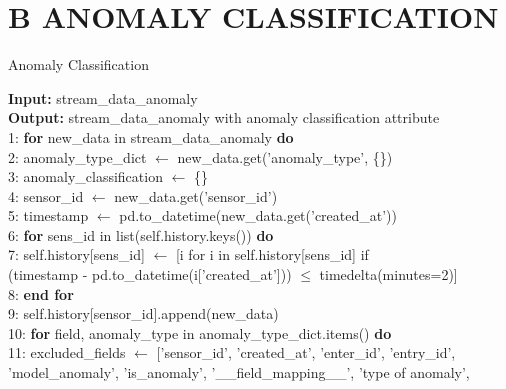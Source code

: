 \section*{B \quad ANOMALY CLASSIFICATION}
\begin{breakablealgorithm}
\footnotesize
\caption{Anomaly Classification}
\begin{flushleft}
\textbf{Input:} stream\_data\_anomaly \\
\textbf{Output:} stream\_data\_anomaly with anomaly classification attribute \\
1: \textbf{for} new\_data in stream\_data\_anomaly \textbf{do} \\
2: \hspace{0.5em} anomaly\_type\_dict $\gets$ new\_data.get('anomaly\_type', \{\}) \\
3: \hspace{0.5em} anomaly\_classification $\gets$ \{\} \\
4: \hspace{0.5em} sensor\_id $\gets$ new\_data.get('sensor\_id') \\
5: \hspace{0.5em} timestamp $\gets$ pd.to\_datetime(new\_data.get('created\_at')) \\
6: \hspace{0.5em} \textbf{for} sens\_id in list(self.history.keys()) \textbf{do} \\
7: \hspace{1em} self.history[sens\_id] $\gets$ [i for i in self.history[sens\_id] if \\
\hspace{1.5em} (timestamp - pd.to\_datetime(i['created\_at'])) $\leq$ timedelta(minutes=2)] \\
8: \hspace{0.5em} \textbf{end for} \\
9: \hspace{0.5em} self.history[sensor\_id].append(new\_data) \\
10: \hspace{0.5em} \textbf{for} field, anomaly\_type in anomaly\_type\_dict.items() \textbf{do} \\
11: \hspace{1em} excluded\_fields $\gets$ ['sensor\_id', 'created\_at', 'enter\_id', 'entry\_id', \\
\hspace{1.5em} 'model\_anomaly', 'is\_anomaly', '\_\_field\_mapping\_\_', 'type of anomaly', \\

\end{flushleft}
\end{breakablealgorithm}
